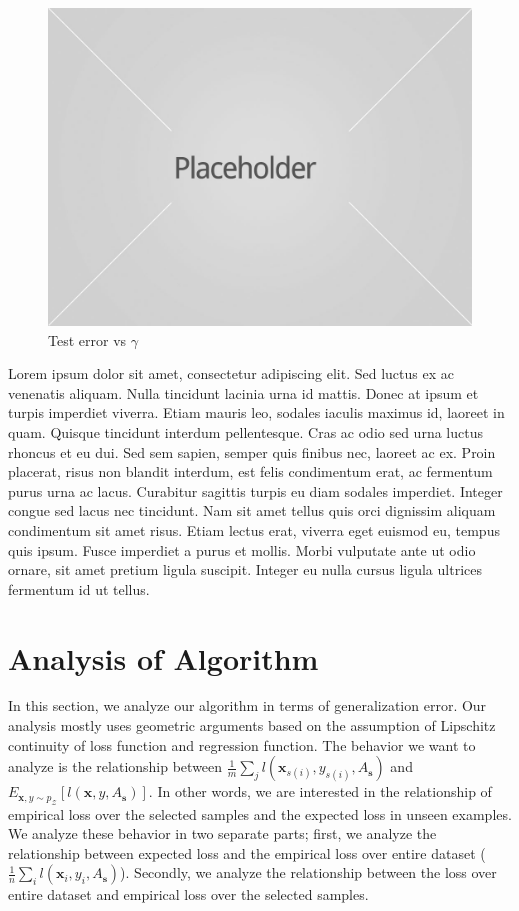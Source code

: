 \documentclass{article}
\begin{document}
\begin{figure}[h]
\includegraphics[width=\columnwidth]{placeholder1.jpg}
\caption{Test error vs $\gamma$}
\end{figure}


Lorem ipsum dolor sit amet, consectetur adipiscing elit. Sed luctus ex ac venenatis aliquam. Nulla tincidunt lacinia urna id mattis. Donec at ipsum et turpis imperdiet viverra. Etiam mauris leo, sodales iaculis maximus id, laoreet in quam. Quisque tincidunt interdum pellentesque. Cras ac odio sed urna luctus rhoncus et eu dui. Sed sem sapien, semper quis finibus nec, laoreet ac ex. Proin placerat, risus non blandit interdum, est felis condimentum erat, ac fermentum purus urna ac lacus. Curabitur sagittis turpis eu diam sodales imperdiet. Integer congue sed lacus nec tincidunt. Nam sit amet tellus quis orci dignissim aliquam condimentum sit amet risus. Etiam lectus erat, viverra eget euismod eu, tempus quis ipsum. Fusce imperdiet a purus et mollis. Morbi vulputate ante ut odio ornare, sit amet pretium ligula suscipit. Integer eu nulla cursus ligula ultrices fermentum id ut tellus.




\section{Analysis of Algorithm}
In this section, we analyze our algorithm in terms of generalization error. Our analysis mostly uses geometric arguments based on the assumption of Lipschitz continuity of loss function and regression function. The behavior we want to analyze is the relationship between $\frac{1}{m}\sum_j l(\mathbf{x}_{s(i)},y_{s(i)},A_{\mathbf{s}})$ and $E_{\mathbf{x},y \sim p_\mathcal{Z}}[l(\mathbf{x},y,A_{\mathbf{s}})]$.  In other words, we are interested in the relationship of empirical loss over the selected samples and the expected loss in unseen examples. We analyze these behavior in two separate parts; first, we analyze the relationship between expected loss and the empirical loss over entire dataset ($\frac{1}{n}\sum_i l(\mathbf{x}_i,y_i,A_\mathbf{s})$). Secondly, we analyze the relationship between the loss over entire dataset and empirical loss over the selected samples.
\end{document}

